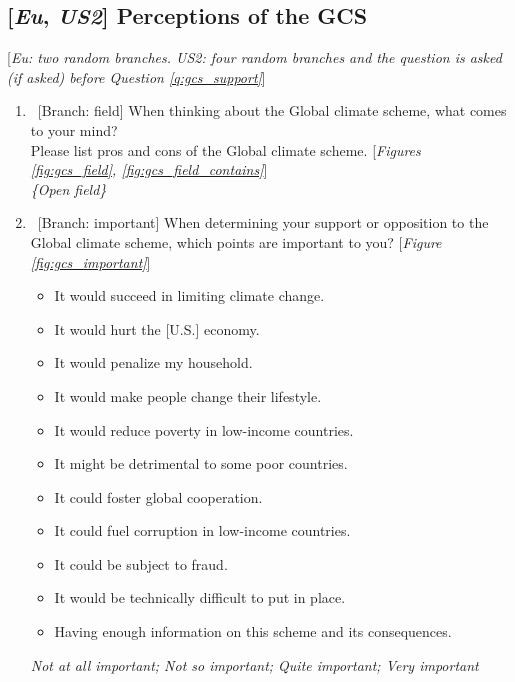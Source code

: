 \documentclass[12pt,english]{article}
\begin{document}
\subsection*{[\textit{Eu}, \textit{US2}] Perceptions of the GCS}\label{subsec:questionnaire_perceptions}
[\textit{Eu: two random branches. \textit{US2}: four random branches and the question is asked (if asked) before Question \ref{q:gcs_support}}]
\begin{enumerate}[resume] \item ~[Branch: field] \label{q:gcs_field} When thinking about the Global climate scheme, what comes to your mind? \\ Please list pros and cons of the Global climate scheme. [\textit{Figures \ref{fig:gcs_field}, \ref{fig:gcs_field_contains}}]
\\ \textit{\{Open field\}} 
\item ~[Branch: important] \label{q:gcs_important} When determining your support or opposition to the Global climate scheme, which points are important to you? [\textit{Figure \ref{fig:gcs_important}}]
\begin{itemize}
    \item It would succeed in limiting climate change. 
    \item It would hurt the [U.S.] economy. 
    \item It would penalize my household. 
    \item It would make people change their lifestyle. 
    \item It would reduce poverty in low-income countries. 
    \item It might be detrimental to some poor countries. 
    \item It could foster global cooperation. 
    \item It could fuel corruption in low-income countries. 
    \item It could be subject to fraud. 
    \item It would be technically difficult to put in place. 
    \item Having enough information on this scheme and its consequences. 
\end{itemize}
\textit{Not at all important; Not so important; Quite important; Very important}
\end{enumerate}
\end{document}
